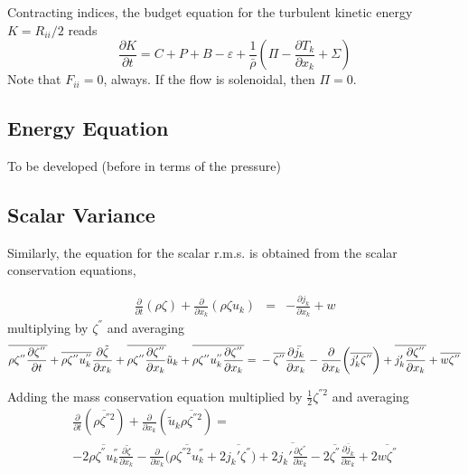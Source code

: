 Contracting indices, the budget equation for the turbulent kinetic energy
$K=R_{ii}/2$ reads
\begin{equation}
  \frac{\partial K}{\partial t}  = C + P  + B - \varepsilon +
  \frac{1}{\bar{\rho}}\left(\Pi - \frac{\partial T_{k}}{ \partial
    x_k}  + \Sigma \right)
\end{equation}
Note that $F_{ii}=0$, always. If the flow is solenoidal, then $\Pi=0$.

\subsection{Energy Equation}

To be developed (before in terms of the pressure)

\subsection{Scalar Variance}

Similarly, the equation for the scalar r.m.s. is obtained from the scalar
conservation equations,

\begin{eqnarray*}
  \frac{\partial}{\partial t}(\rho \zeta) + 
  \frac{\partial}{\partial x_k}(\rho \zeta u_k) & = & 
  -\frac{\partial j_k}{\partial x_k}
  + w
\end{eqnarray*}
multiplying by $\zeta^{''}$ and averaging
\begin{equation}
  \label{eq:scalar1}
  \overline{\rho \zeta^{''} \frac{\partial \zeta^{''}}{\partial t}}
  + \overline{\rho \zeta^{''} u^{''}_k} \frac{\partial \tilde{\zeta}}{\partial x_k}
  + \overline{\rho \zeta^{''} \frac{\partial \zeta^{''}}{\partial x_k}} \tilde{u}_k
  + \overline{\rho \zeta^{''} u^{''}_k \frac{\partial \zeta^{''}}{\partial x_k}}
  = \\
  -\overline{\zeta^{''}}\frac{\partial \bar{j_k}}{\partial x_k}
  -\frac{\partial }{\partial x_k}\bigg(\overline{j_k' \zeta^{''}} \bigg)
  +\overline{j_k' \frac{\partial \zeta^{''}}{\partial x_k}}
  + \overline{w\zeta^{''}}
\end{equation}

Adding the mass conservation equation multiplied by $\frac{1}{2}\zeta^{''2}$
and averaging
\begin{multline}
  \label{eq:scalar2}
  \frac{\partial}{\partial t}(\overline{\rho \zeta^{''2}})
  + \frac{\partial }{\partial x_k}(\tilde{u}_k \overline{\rho \zeta^{''2}}) =\\
  -2 \overline{\rho \zeta^{''} u^{''}_k} \frac{\partial \tilde{\zeta}}{
    \partial x_k} - \frac{\partial}{\partial x_k}\bigg( 
  \overline{\rho \zeta^{''2} u^{''}_k} + 2\overline{j_k' \zeta^{''} }
  \bigg) +2 \overline{j_k'\frac{\partial \zeta^{''}}{\partial x_k}}
  -2\overline{\zeta^{''}}\frac{\partial \bar{j}_k}{\partial x_k}
  + 2 \overline{w\zeta^{''}}
\end{multline}

